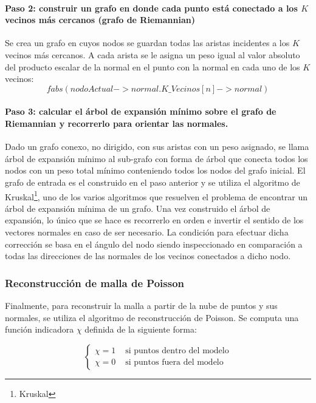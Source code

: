 \paragraph{Paso 2: construir un grafo en donde cada punto está conectado a los $K$ vecinos más cercanos (grafo de Riemannian)}
Se crea un grafo en cuyos nodos se guardan todas las aristas incidentes a los $K$ vecinos más cercanos. A cada arista se le asigna un peso igual al valor absoluto del producto escalar de la normal en el punto con la normal en cada uno de los $K$ vecinos:
   $$fabs(nodoActual->normal . K\_Vecinos[n]->normal)$$
\paragraph{Paso 3: calcular el árbol de expansión mínimo sobre el grafo de Riemannian y recorrerlo para orientar las normales.}
Dado un grafo conexo, no dirigido, con sus aristas con un peso asignado, se llama árbol de expansión mínimo al sub-grafo con forma de árbol que conecta todos los nodos con un peso total mínimo conteniendo todos los nodos del grafo inicial. El grafo de entrada es el construido en el paso anterior y se utiliza el algoritmo de Kruskal\footnote{Kruskal}, uno de los varios algoritmos que resuelven el problema de encontrar un árbol de expansión mínima de un grafo.
Una vez construido el árbol de expansión, lo único que se hace es recorrerlo en orden e invertir el sentido de los vectores normales en caso de ser necesario. La condición para efectuar dicha corrección se basa en el ángulo del nodo siendo inspeccionado en comparación a todas las direcciones de las normales de los vecinos conectados a dicho nodo.

\subsubsection{Reconstrucción de malla de Poisson}

Finalmente, para reconstruir la malla a partir de la nube de puntos y sus normales, se utiliza el algoritmo de reconstrucción de Poisson.
Se computa una función indicadora $\chi$ definida de la siguiente forma:

$$
\left\{ \begin{array}{rl}
 \chi = 1 & \mbox{ si puntos dentro del modelo} \\
 \chi = 0 & \mbox{ si puntos fuera del modelo}
       \end{array} \right.
$$


